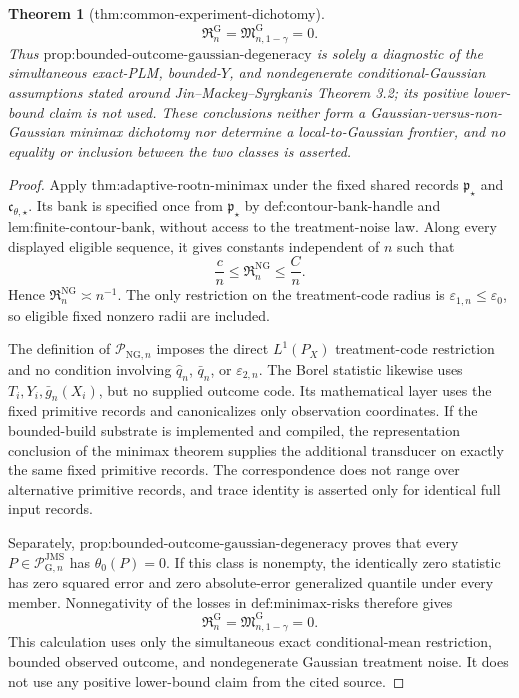 \documentclass{article}
\newtheorem{theorem}{Theorem}
\begin{document}
\begin{theorem}[thm:common-experiment-dichotomy]
\[
 \mathfrak R_n^{\mathrm G}
 =\mathfrak M_{n,1-\gamma}^{\mathrm G}
 =0.
\]
Thus \(\text{prop:bounded-outcome-gaussian-degeneracy}\) is solely a diagnostic of the simultaneous exact-PLM, bounded-\(Y\), and nondegenerate conditional-Gaussian assumptions stated around Jin--Mackey--Syrgkanis Theorem 3.2; its positive lower-bound claim is not used. These conclusions neither form a Gaussian-versus-non-Gaussian minimax dichotomy nor determine a local-to-Gaussian frontier, and no equality or inclusion between the two classes is asserted.
\end{theorem}
\begin{proof}
Apply \(\text{thm:adaptive-rootn-minimax}\) under the fixed shared records
\(\mathfrak p_{\star}\) and \(\mathfrak c_{\theta,\star}\).  Its bank is
specified once from \(\mathfrak p_{\star}\) by
\(\text{def:contour-bank-handle}\) and
\(\text{lem:finite-contour-bank}\), without access to the treatment-noise
law.  Along every displayed eligible sequence, it gives constants
independent of \(n\) such that
\[
 \frac cn\le\mathfrak R_n^{\mathrm{NG}}\le\frac Cn.
\]
Hence \(\mathfrak R_n^{\mathrm{NG}}\asymp n^{-1}\).  The only restriction
on the treatment-code radius is \(\varepsilon_{1,n}\le\varepsilon_0\), so
eligible fixed nonzero radii are included.

The definition of \(\mathcal P_{\mathrm{NG},n}\) imposes the direct
\(L^1(P_X)\) treatment-code restriction and no condition involving
\(\widehat q_n\), \(\bar q_n\), or \(\varepsilon_{2,n}\).  The Borel
statistic likewise uses \(T_i,Y_i,\bar g_n(X_i)\), but no supplied outcome
code.  Its mathematical layer uses the fixed primitive records and
canonicalizes only observation coordinates.  If the bounded-build substrate
is implemented and compiled, the representation conclusion of the minimax
theorem supplies the additional transducer on exactly the same fixed
primitive records.  The correspondence does not range over alternative
primitive records, and trace identity is asserted only for identical full
input records.

Separately, \(\text{prop:bounded-outcome-gaussian-degeneracy}\) proves that
every \(P\in\mathcal P_{\mathrm G,n}^{\mathrm{JMS}}\) has
\(\theta_0(P)=0\).  If this class is nonempty, the identically zero statistic
has zero squared error and zero absolute-error generalized quantile under
every member.  Nonnegativity of the losses in \(\text{def:minimax-risks}\)
therefore gives
\[
 \mathfrak R_n^{\mathrm G}
 =\mathfrak M_{n,1-\gamma}^{\mathrm G}=0.
\]
This calculation uses only the simultaneous exact conditional-mean
restriction, bounded observed outcome, and nondegenerate Gaussian treatment
noise.  It does not use any positive lower-bound claim from the cited source.


\end{proof}
\end{document}
